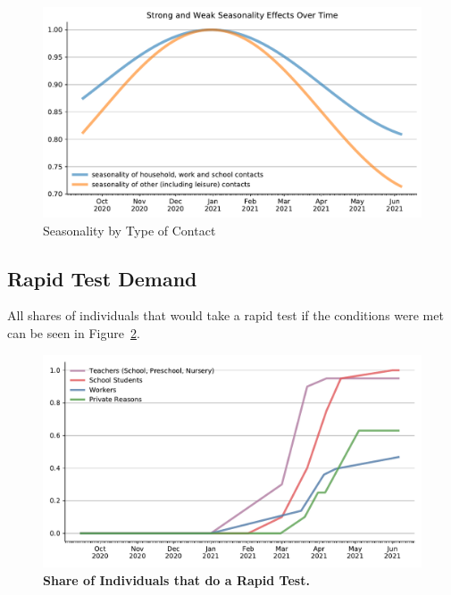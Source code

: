\begin{figure}
    \centering
    \includegraphics[width=\textwidth]{../figures/results/figures/data/seasonality}
    \caption{Seasonality by Type of Contact}
    \label{fig:seasonality}
    \floatfoot{\noindent}
\end{figure}



\FloatBarrier

\subsection{Rapid Test Demand}




All shares of individuals that would take a rapid test if the conditions were met can be
seen in Figure~\ref{fig:rapid_test_demand}.

\begin{figure}
    \centering
    \includegraphics[width=\textwidth]{../figures/results/figures/data/testing/rapid_test_demand_shares}
    \caption{\textbf{Share of Individuals that do a Rapid Test.}}
    \label{fig:rapid_test_demand}
\end{figure}


